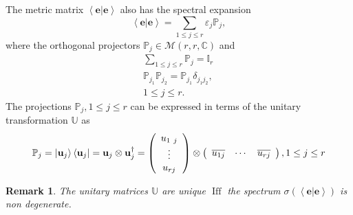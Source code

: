 \documentclass[aps,preprint]{revtex4}%
\newtheorem{remark}[theorem]{Remark}
\begin{document}
The metric matrix $\left\langle \left.  \mathbf{e}\right\vert \mathbf{e}%
\right\rangle $ also has the spectral expansion
\begin{equation}
\left\langle \left.  \mathbf{e}\right\vert \mathbf{e}\right\rangle
=\sum\limits_{1\leq j\leq r}\varepsilon_{j}\mathbb{P}_{j},
\end{equation}
where the orthogonal projectors $\mathbb{P}_{j}\in\mathcal{M}\left(
r,r,\mathbb{C}\right)  $ and
\begin{gather}
\sum\limits_{1\leq j\leq r}\mathbb{P}_{j}=\mathbb{I}_{r}\\
\mathbb{P}_{j_{1}}\mathbb{P}_{j_{2}}=\mathbb{P}_{j_{1}}\delta_{j_{1}j_{2}%
},\,\\
1\leq j\leq r.
\end{gather}
The projections $\mathbb{P}_{j},1\leq j\leq r$ can be expressed in terms of
the unitary transformation $\mathbb{U}$ as
\begin{equation}
\mathbb{P}_{j}=\left\vert \mathbf{u}_{j}\right\rangle \left\langle
\mathbf{u}_{j}\right\vert =\mathbf{u}_{j}\otimes\mathbf{u}_{j}^{\dagger
}=\left(
\begin{array}
[c]{c}%
u_{1\ j}\\
\vdots\\
u_{rj}%
\end{array}
\right)  \otimes\left(
\begin{array}
[c]{ccc}%
\overline{u_{1j}} & \cdots & \overline{u_{rj}}%
\end{array}
\right)  ,1\leq j\leq r
\end{equation}


\begin{remark}
The unitary matrices $\mathbb{U}$ are unique $\operatorname*{Iff}$ the
spectrum $\sigma\left(  \left\langle \left.  \mathbf{e}\right\vert
\mathbf{e}\right\rangle \right)  $ is non degenerate.
\end{remark}
\end{document}
